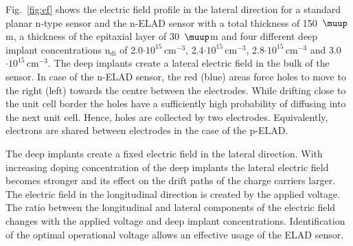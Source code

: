 \documentclass[a4paper,11pt]{article}
\begin{document}
Fig.~\ref{fig:ef} shows the electric field profile in the lateral direction for a standard planar n-type sensor and the n-ELAD sensor with a total thickness of 150~$\muup$m, a thickness of the epitaxial layer of 30~$\muup$m and four different deep implant concentrations $\mathrm{n_{di}}$ of 2.0$\mathrm{\cdot10^{15}\,cm^{-3}}$, 2.4$\mathrm{\cdot10^{15}\,cm^{-3}}$, 2.8$\mathrm{\cdot10^{15}\,cm^{-3}}$ and 3.0$\mathrm{\cdot10^{15}\,cm^{-3}}$.
The deep implants create a lateral electric field in the bulk of the sensor.
In case of the n-ELAD sensor, the red (blue) areas force holes to move to the right (left) towards the centre between the electrodes.
While drifting close to the unit cell border the holes have a sufficiently high probability of diffusing into the next unit cell.
Hence, holes are collected by two electrodes.
Equivalently, electrons are shared between electrodes in the case of the p-ELAD.

The deep implants create a fixed electric field in the lateral direction. 
With increasing doping concentration of the deep implants the lateral electric field becomes stronger and its effect on the drift paths of the charge carriers larger.
The electric field in the longitudinal direction is created by the applied voltage. 
The ratio between the longitudinal and lateral components of the electric field changes with the applied voltage and deep implant concentrations.
Identification of the optimal operational voltage allows an effective usage of the ELAD sensor.
\end{document}
